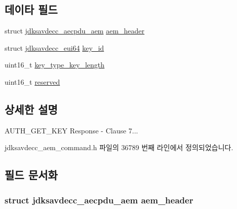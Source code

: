 \subsection*{데이타 필드}
\begin{DoxyCompactItemize}
\item 
struct \hyperlink{structjdksavdecc__aecpdu__aem}{jdksavdecc\+\_\+aecpdu\+\_\+aem} \hyperlink{structjdksavdecc__aem__command__auth__get__key__response_ae1e77ccb75ff5021ad923221eab38294}{aem\+\_\+header}
\item 
struct \hyperlink{structjdksavdecc__eui64}{jdksavdecc\+\_\+eui64} \hyperlink{structjdksavdecc__aem__command__auth__get__key__response_a37cbdf6056556ccfaee3ab01dc7c3032}{key\+\_\+id}
\item 
uint16\+\_\+t \hyperlink{structjdksavdecc__aem__command__auth__get__key__response_aa4ab2c8fde3f5a7c664d627933272a14}{key\+\_\+type\+\_\+key\+\_\+length}
\item 
uint16\+\_\+t \hyperlink{structjdksavdecc__aem__command__auth__get__key__response_a5a6ed8c04a3db86066924b1a1bf4dad3}{reserved}
\end{DoxyCompactItemize}


\subsection{상세한 설명}
A\+U\+T\+H\+\_\+\+G\+E\+T\+\_\+\+K\+EY Response -\/ Clause 7... 

jdksavdecc\+\_\+aem\+\_\+command.\+h 파일의 36789 번째 라인에서 정의되었습니다.



\subsection{필드 문서화}
\subsubsection[{\texorpdfstring{aem\+\_\+header}{aem_header}}]{\setlength{\rightskip}{0pt plus 5cm}struct {\bf jdksavdecc\+\_\+aecpdu\+\_\+aem} aem\+\_\+header}\hypertarget{structjdksavdecc__aem__command__auth__get__key__response_ae1e77ccb75ff5021ad923221eab38294}{}\label{structjdksavdecc__aem__command__auth__get__key__response_ae1e77ccb75ff5021ad923221eab38294}


